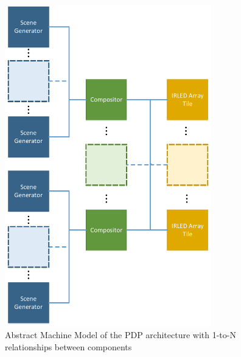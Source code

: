 \begin{figure}
    \centering
        \centering
        \includegraphics[width=0.80\textwidth]{fig/amm.pdf}
        \caption{Abstract Machine Model of the PDP architecture with 1-to-N relationships between components}
        \label{fig:amm}
\end{figure}

